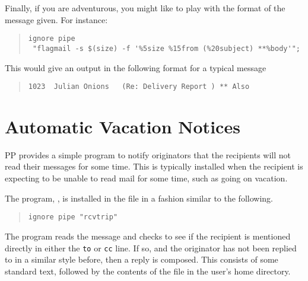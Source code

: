Finally, if you are adventurous, you might like to play with the
format of the message given. For instance:
\begin{quote}\small\begin{verbatim}
ignore pipe 
 "flagmail -s $(size) -f '%5size %15from (%20subject) **%body'";
\end{verbatim}\end{quote}

This would give an output in the following format for a typical message
\begin{quote}\small\begin{verbatim}
1023  Julian Onions   (Re: Delivery Report ) ** Also 
\end{verbatim}\end{quote}

\section{Automatic Vacation Notices}

PP provides a simple program to notify originators that the recipients
will not read their messages for some time. This is typically installed
when the recipient is expecting to be unable to read mail for some
time, such as going on vacation.

The program, , is installed in the 
file in a fashion similar to the following.

\begin{quote}\small\begin{verbatim}
ignore pipe "rcvtrip"
\end{verbatim}\end{quote}

The program reads the message and checks to see if the recipient is
mentioned directly in either the \verb|to| or \verb|cc| line. If so,
and the originator has not been replied to in a similar style before,
then a reply is composed. This consists of some standard text,
followed by the contents of the file  in the user's home
directory.

